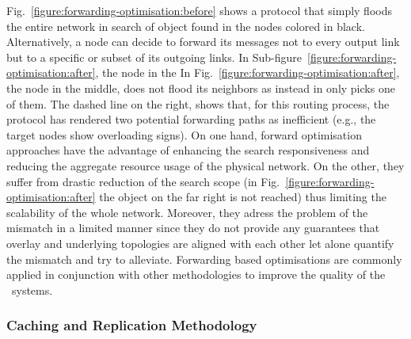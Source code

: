 Fig.~\ref{figure:forwarding-optimisation:before} 
shows a protocol that simply floods the entire network 
in search of object found in the nodes colored in black.
Alternatively, a node can decide to forward its
messages not to every output link but to a specific 
or subset of its outgoing links. 
In Sub-figure~\ref{figure:forwarding-optimisation:after}, the node in the
In Fig.~\ref{figure:forwarding-optimisation:after}, 
the node in the middle, does not flood its neighbors as instead 
in only picks one of them.
The dashed line on the right, shows that, 
for this routing process, the protocol has
rendered two potential forwarding paths as inefficient (e.g., the target nodes
show overloading signs). 
On one hand, forward
optimisation approaches have 
the advantage of enhancing the
search responsiveness and reducing the aggregate resource 
usage of the physical network. On the other, 
they suffer from drastic reduction of the search
scope (in Fig.~\ref{figure:forwarding-optimisation:after} the object on
the far right is not reached) thus limiting the scalability of the whole
network. 
Moreover, they adress the problem of the mismatch in a limited manner
since they do not provide any guarantees 
that overlay and underlying topologies are
aligned with each other let alone quantify the mismatch 
and try to alleviate.
Forwarding based optimisations are commonly applied in
conjunction with other methodologies to improve 
the quality of the \p\ systems.




\subsubsection{Caching and Replication Methodology}

